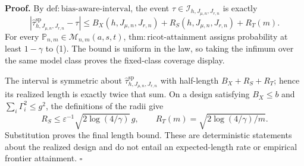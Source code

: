 \textbf{Proof.}
By \(\mathrm{def:bias\text{-}aware\text{-}interval}\), the event \(\tau\in\mathcal I_{h,J_{\mu,n},J_{r,n}}\) is exactly
\[
\left|\widehat\tau^{\mathrm{sp}}_{h,J_{\mu,n},J_{r,n}}-\tau\right|
\le B_X(h,J_{\mu,n},J_{r,n})+R_S(h,J_{\mu,n},J_{r,n})+R_T(m).
\tag{1}
\]
For every \(\mathbb P_{n,m}\in\mathcal M_{n,m}(a,s,t)\), \(\mathrm{thm:ricot\text{-}attainment}\) assigns probability at least \(1-\gamma\) to (1). The bound is uniform in the law, so taking the infimum over the same model class proves the fixed-class coverage display.

The interval is symmetric about \(\widehat\tau^{\mathrm{sp}}_{h,J_{\mu,n},J_{r,n}}\) with half-length \(B_X+R_S+R_T\); hence its realized length is exactly twice that sum. On a design satisfying \(B_X\le b\) and \(\sum_i\Gamma_i^2\le g^2\), the definitions of the radii give
\[
R_S\le\varepsilon^{-1}\sqrt{2\log(4/\gamma)}\,g,
\qquad
R_T(m)=\sqrt{2\log(4/\gamma)/m}.
\]
Substitution proves the final length bound. These are deterministic statements about the realized design and do not entail an expected-length rate or empirical frontier attainment. \(\square\)